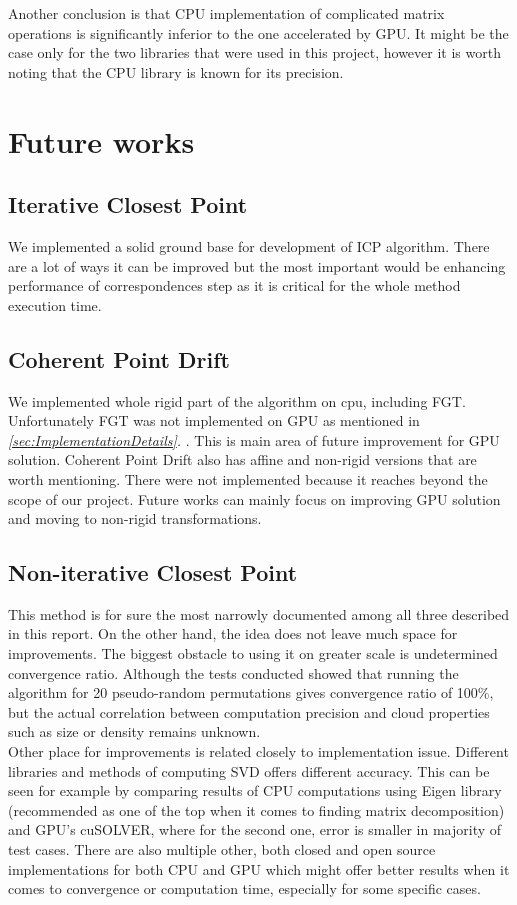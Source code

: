 \documentclass[titlepage]{article}
\begin{document}
Another conclusion is that CPU implementation of complicated matrix operations is significantly inferior to the one accelerated by GPU. It might be the case only for the two libraries that were used in this project, however it is worth noting that the CPU library is known for its precision.

\section{Future works}

\subsection{Iterative Closest Point}
We implemented a solid ground base for development of ICP algorithm. There are a lot of ways it can be improved but the most important would be enhancing performance of correspondences step as it is critical for the whole method execution time.

\subsection{Coherent Point Drift}
We implemented whole rigid part of the algorithm on cpu, including FGT. Unfortunately FGT was not implemented on GPU as mentioned in \textit{\ref{sec:ImplementationDetails}. }. This is main area of future improvement for GPU solution. Coherent Point Drift also has affine and non-rigid versions that are worth mentioning. There were not implemented because it reaches beyond the scope of our project. Future works can mainly focus on improving GPU solution and moving to non-rigid transformations.

\subsection{Non-iterative Closest Point}
This method is for sure the most narrowly documented among all three described in this report. On the other hand, the idea does not leave much space for improvements. The biggest obstacle to using it on greater scale is undetermined convergence ratio. Although the tests conducted showed that running the algorithm for 20 pseudo-random permutations gives convergence ratio of 100\%, but the actual correlation between computation precision and cloud properties such as size or density remains unknown.\\
Other place for improvements is related closely to implementation issue. Different libraries and methods of computing SVD offers different accuracy. This can be seen for example by comparing results of CPU computations using Eigen library (recommended as one of the top when it comes to finding matrix decomposition) and GPU's cuSOLVER, where for the second one, error is smaller in majority of test cases. There are also multiple other, both closed and open source implementations for both CPU and GPU which might offer better results when it comes to convergence or computation time, especially for some specific cases.
\end{document}
